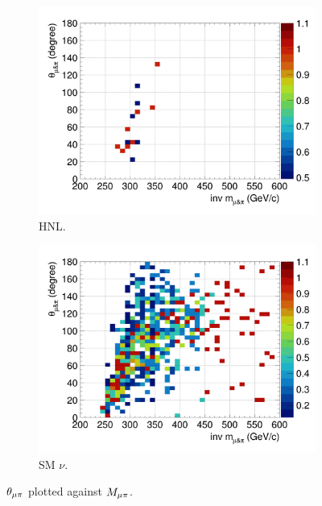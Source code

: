         \begin{figure}[!htb]
           \centering
           \begin{subfigure}{0.45\textwidth}
                \includegraphics[width=\textwidth]{figures/hnl_sfgmu_mpinvm_colnor_vs_mpang_hist2d_al9_300.png}
                \caption{HNL.}
                \label{fig:hnl-mmupi}
           \end{subfigure}
           \begin{subfigure}{0.45\textwidth}
                \includegraphics[width=\textwidth]{figures/hnl_sfgmu_mpinvm_colnor_vs_mpang_hist2d_al9_SM.png}
                \caption{SM $\nu$.}
                \label{fig:sm-mmupi}
           \end{subfigure}
           \caption{$\theta_{\mu\pi}$ plotted against $M_{\mu\pi}$.}
           \label{fig:mmupi-mupiang}
        \end{figure}

